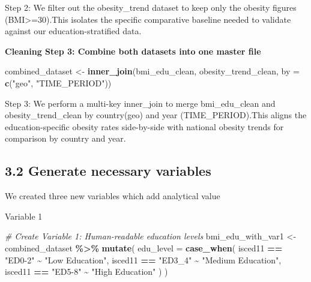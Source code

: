 \documentclass[
]{article}
\newenvironment{Shaded}{\begin{snugshade}}{\end{snugshade}}
\newcommand{\AttributeTok}[1]{\textcolor[rgb]{0.13,0.29,0.53}{#1}}
\newcommand{\CommentTok}[1]{\textcolor[rgb]{0.56,0.35,0.01}{\textit{#1}}}
\newcommand{\FunctionTok}[1]{\textcolor[rgb]{0.13,0.29,0.53}{\textbf{#1}}}
\newcommand{\NormalTok}[1]{#1}
\newcommand{\OtherTok}[1]{\textcolor[rgb]{0.56,0.35,0.01}{#1}}
\newcommand{\SpecialCharTok}[1]{\textcolor[rgb]{0.81,0.36,0.00}{\textbf{#1}}}
\newcommand{\StringTok}[1]{\textcolor[rgb]{0.31,0.60,0.02}{#1}}
\begin{document}
Step 2: We filter out the obesity\_trend dataset to keep only the
obesity figures (BMI\textgreater=30).This isolates the specific
comparative baseline needed to validate against our education-stratified
data.

\textbf{Cleaning Step 3: Combine both datasets into one master file}

\begin{Shaded}
\begin{Highlighting}[]
\NormalTok{combined\_dataset }\OtherTok{\textless{}{-}} \FunctionTok{inner\_join}\NormalTok{(bmi\_edu\_clean, obesity\_trend\_clean, }\AttributeTok{by =} \FunctionTok{c}\NormalTok{(}\StringTok{"geo"}\NormalTok{, }\StringTok{"TIME\_PERIOD"}\NormalTok{))}
\end{Highlighting}
\end{Shaded}

Step 3: We perform a multi-key inner\_join to merge bmi\_edu\_clean and
obesity\_trend\_clean by country(geo) and year (TIME\_PERIOD).This
aligns the education-specific obesity rates side-by-side with national
obesity trends for comparison by country and year.

\subsection{3.2 Generate necessary
variables}\label{generate-necessary-variables}

We created three new variables which add analytical value

Variable 1

\begin{Shaded}
\begin{Highlighting}[]
\CommentTok{\# Create Variable 1: Human{-}readable education levels}
\NormalTok{bmi\_edu\_with\_var1 }\OtherTok{\textless{}{-}}\NormalTok{ combined\_dataset }\SpecialCharTok{\%\textgreater{}\%}
  \FunctionTok{mutate}\NormalTok{(}
    \AttributeTok{edu\_level =} \FunctionTok{case\_when}\NormalTok{(}
\NormalTok{      isced11 }\SpecialCharTok{==} \StringTok{"ED0{-}2"} \SpecialCharTok{\textasciitilde{}} \StringTok{"Low Education"}\NormalTok{,}
\NormalTok{      isced11 }\SpecialCharTok{==} \StringTok{"ED3\_4"} \SpecialCharTok{\textasciitilde{}} \StringTok{"Medium Education"}\NormalTok{,}
\NormalTok{      isced11 }\SpecialCharTok{==} \StringTok{"ED5{-}8"} \SpecialCharTok{\textasciitilde{}} \StringTok{"High Education"}
\NormalTok{    )}
\NormalTok{  )}
\end{Highlighting}
\end{Shaded}
\end{document}
